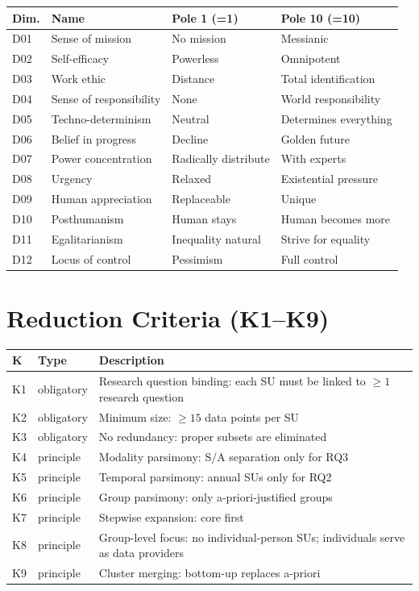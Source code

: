 \documentclass[12pt,a4paper]{article}
\begin{document}
\begin{tabular}{@{} L{1.1cm} L{3.8cm} L{4.8cm} L{4.8cm} @{}}
  \toprule
  \textbf{Dim.} & \textbf{Name} & \textbf{Pole 1 (=1)} & \textbf{Pole 10 (=10)} \\
  \midrule
  D01 & Sense of mission & No mission & Messianic \\
  D02 & Self-efficacy & Powerless & Omnipotent \\
  D03 & Work ethic & Distance & Total identification \\
  D04 & Sense of responsibility & None & World responsibility \\
  D05 & Techno-determinism & Neutral & Determines everything \\
  D06 & Belief in progress & Decline & Golden future \\
  D07 & Power concentration & Radically distribute & With experts \\
  D08 & Urgency & Relaxed & Existential pressure \\
  D09 & Human appreciation & Replaceable & Unique \\
  D10 & Posthumanism & Human stays & Human becomes more \\
  D11 & Egalitarianism & Inequality natural & Strive for equality \\
  D12 & Locus of control & Pessimism & Full control \\
  \bottomrule
\end{tabular}


\section{Reduction Criteria (K1--K9)}
\label{app:reduktion}

\begin{tabular}{@{} L{1.0cm} L{2.8cm} L{10.8cm} @{}}
  \toprule
  \textbf{K} & \textbf{Type} & \textbf{Description} \\
  \midrule
  K1 & obligatory & Research question binding: each SU must be linked to $\geq 1$ research question \\
  K2 & obligatory & Minimum size: $\geq 15$ data points per SU \\
  K3 & obligatory & No redundancy: proper subsets are eliminated \\
  K4 & principle & Modality parsimony: S/A separation only for RQ3 \\
  K5 & principle & Temporal parsimony: annual SUs only for RQ2 \\
  K6 & principle & Group parsimony: only a-priori-justified groups \\
  K7 & principle & Stepwise expansion: core first \\
  K8 & principle & Group-level focus: no individual-person SUs; individuals serve as data providers \\
  K9 & principle & Cluster merging: bottom-up replaces a-priori \\
  \bottomrule
\end{tabular}
\end{document}
